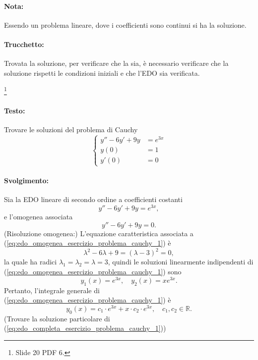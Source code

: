 \begin{example}
	\paragraph{Nota:} Essendo un problema lineare, dove i coefficienti sono continui si ha la soluzione.
	\paragraph{Trucchetto:} Trovata la soluzione, per verificare che la sia, è necessario verificare che la soluzione rispetti le condizioni iniziali e che l'EDO sia verificata.
\end{example}

\begin{example}\footnote{Slide 20 PDF 6.}
	\paragraph{Testo:} Trovare le soluzioni del problema di Cauchy
	\begin{equation*}
		\begin{cases}
			y'' - 6y' + 9 y &= e^{3x}\\
			y(0) &= 1\\
			y'(0) &=0
		\end{cases}
	\end{equation*}
	\paragraph{Svolgimento:} Sia la EDO lineare di secondo ordine a coefficienti costanti
	\begin{equation}\label{eq:edo_completa_esercizio_problema_cauchy_1}
		y'' - 6 y' + 9 y = e^{3x},
	\end{equation}
	e l'omogenea associata
	\begin{equation}\label{eq:edo_omogenea_esercizio_problema_cauchy_1}
		y'' - 6 y' + 9 y= 0.
	\end{equation}
	(Risoluzione omogenea:) L'equazione caratteristica associata a (\ref{eq:edo_omogenea_esercizio_problema_cauchy_1}) è
	\begin{equation*}
		\lambda^2 - 6\lambda + 9 = (\lambda -3)^2 = 0,
	\end{equation*}
	la quale ha radici $\lambda_1=\lambda_2=\lambda = 3$, quindi le soluzioni linearmente indipendenti di (\ref{eq:edo_omogenea_esercizio_problema_cauchy_1}) sono
	\begin{equation*}
		y_1(x) = e^{3x},\quad y_2(x) = xe^{3x}.
	\end{equation*}
	Pertanto, l'integrale generale di (\ref{eq:edo_omogenea_esercizio_problema_cauchy_1}) è
	\begin{equation*}
		y_0(x) = c_1 \cdot e^{3x} + x \cdot c_2 \cdot e^{3x},\quad c_1,c_2\in\mathbb{R}.
	\end{equation*}
	(Trovare la soluzione particolare di (\ref{eq:edo_completa_esercizio_problema_cauchy_1}))

\end{example}
